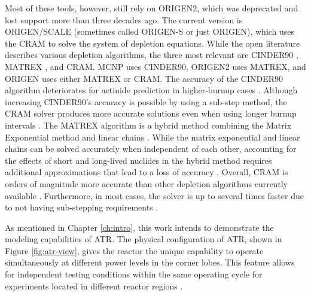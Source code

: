 Most of these tools, however, still rely on ORIGEN2, which was deprecated and lost support more than three decades ago.
The current version is ORIGEN/SCALE (sometimes called ORIGEN-S or just ORIGEN), which uses the \gls*{CRAM} \cite{cram} to solve the system of depletion equations.
While the open literature describes various depletion algorithms, the three most relevant are CINDER90 \cite{mcnp-cinder}, MATREX \cite{scale}, and \gls*{CRAM}.
MCNP uses CINDER90, ORIGEN2 uses MATREX, and ORIGEN uses either MATREX or CRAM.
The accuracy of the CINDER90 algorithm deteriorates for actinide prediction in higher-burnup cases \cite{mcnp-cinder}.
Although increasing CINDER90’s accuracy is possible by using a sub-step method, the CRAM solver produces more accurate solutions even when using longer burnup intervals \cite{vera}.
The MATREX algorithm is a hybrid method combining the Matrix Exponential method and linear chains \cite{origen2}.
While the matrix exponential and linear chains can be solved accurately when independent of each other, accounting for the effects of short and long-lived nuclides in the hybrid method requires additional approximations that lead to a loss of accuracy \cite{origen-cram}.
Overall, CRAM is orders of magnitude more accurate than other depletion algorithms currently available \cite{vera, origen2, origen-cram}.
Furthermore, in most cases, the solver is up to several times faster due to not having sub-stepping requirements \cite{origen-cram}.

As mentioned in Chapter \ref{ch:intro}, this work intends to demonstrate the modeling capabilities of ATR.
The physical configuration of ATR, shown in Figure \ref{fig:atr-view}, gives the reactor the unique capability to operate simultaneously at different power levels in the corner lobes.
This feature allows for independent testing conditions within the same operating cycle for experiments located in different reactor regions \cite{atr}.

